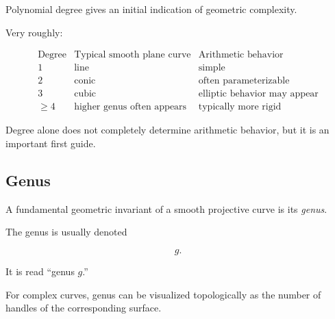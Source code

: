 Polynomial degree gives an initial indication of geometric complexity.

Very roughly:

\[
\begin{array}{c|c|c}
\text{Degree} & \text{Typical smooth plane curve} & \text{Arithmetic behavior}\\
\hline
1 & \text{line} & \text{simple}\\
2 & \text{conic} & \text{often parameterizable}\\
3 & \text{cubic} & \text{elliptic behavior may appear}\\
\geq4 & \text{higher genus often appears} & \text{typically more rigid}
\end{array}
\]

Degree alone does not completely determine arithmetic behavior, but it is an
important first guide.

\subsection{Genus}
\label{subsec:genus-diophantine}

A fundamental geometric invariant of a smooth projective curve is its
\emph{genus}.

The genus is usually denoted

\[ g. \]

It is read ``genus \(g\).''

For complex curves, genus can be visualized topologically as the number of
handles of the corresponding surface.

\begin{centereddiagram}
\end{centereddiagram}

